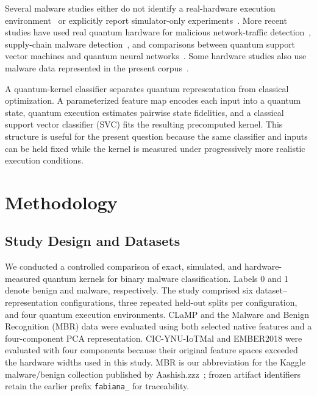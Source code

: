 \documentclass[letterpaper]{article} %
\begin{document}
Several malware studies either do not identify a real-hardware execution environment~\cite{joshi2025quantumaialgorithmdevelopment} or explicitly report simulator-only experiments~\cite{10.1145/3538969.3543816,mercaldo2022towards,11249907,10.1145/3696673.3723063}. More recent studies have used real quantum hardware for malicious network-traffic detection~\cite{cotrupi}, supply-chain malware detection~\cite{11071553}, and comparisons between quantum support vector machines and quantum neural networks~\cite{10.1007/978-3-031-74643-7_19}. Some hardware studies also use malware data represented in the present corpus~\cite{11071553}.

A quantum-kernel classifier separates quantum representation from classical optimization. A parameterized feature map encodes each input into a quantum state, quantum execution estimates pairwise state fidelities, and a classical support vector classifier (SVC) fits the resulting precomputed kernel. This structure is useful for the present question because the same classifier and inputs can be held fixed while the kernel is measured under progressively more realistic execution conditions.

\section{Methodology}

\subsection{Study Design and Datasets}

We conducted a controlled comparison of exact, simulated, and hardware-measured quantum kernels for binary malware classification. Labels 0 and 1 denote benign and malware, respectively. The study comprised six dataset--representation configurations, three repeated held-out splits per configuration, and four quantum execution environments. CLaMP and the Malware and Benign Recognition (MBR) data were evaluated using both selected native features and a four-component PCA representation. CIC-YNU-IoTMal and EMBER2018 were evaluated with four components because their original feature spaces exceeded the hardware widths used in this study. MBR is our abbreviation for the Kaggle malware/benign collection published by Aashish.zzz~\cite{synthetic}; frozen artifact identifiers retain the earlier prefix \texttt{fabiana\_} for traceability.
\end{document}

